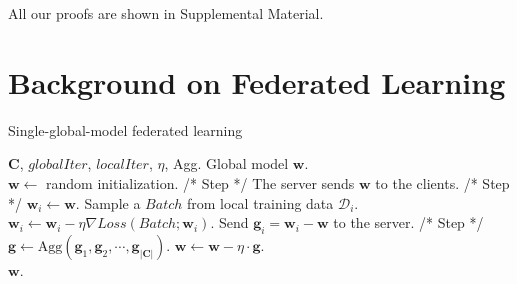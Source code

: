 \documentclass[letterpaper]{article} %
\newcommand{\RomanNumeralCaps}[1]
    {\MakeUppercase{\romannumeral #1}}
\begin{document}
All our proofs are shown in Supplemental Material.



\section{Background on Federated Learning}

\begin{algorithm}[t]
	\caption{Single-global-model federated learning}\label{alg:base_alg}
	\begin{algorithmic}[1]
		 $\mathbf{C}$, $globalIter$, $localIter$, $\eta$, Agg.
     Global model $\mathbf{w}$.\\
		\STATE $\mathbf{w} \leftarrow $ random initialization.
		    \STATE /* Step \RomanNumeralCaps{1} */
		    \STATE The server sends $\mathbf{w}$ to the clients.
	        \STATE /* Step \RomanNumeralCaps{2} */
		        \STATE $\mathbf{w}_i \leftarrow \mathbf{w}$.
		            \STATE Sample a $Batch$ from local training data $\mathcal{D}_i$.
		            \STATE $\mathbf{w}_i \leftarrow \mathbf{w}_i - \eta \nabla Loss(Batch;\mathbf{w}_i)$.
		        \ENDFOR
	            \STATE Send $\mathbf{g}_i=\mathbf{w}_i-\mathbf{w}$ to the server.
		    \ENDFOR
		    \STATE /* Step \RomanNumeralCaps{3} */
            \STATE $\mathbf{g} \leftarrow \text{Agg}(\mathbf{g}_1, \mathbf{g}_2, \cdots, \mathbf{g}_{|\mathbf{C}|})$.
            \STATE $\mathbf{w} \leftarrow \mathbf{w} - \eta\cdot \mathbf{g}$.
		\ENDFOR\\
		\RETURN $\mathbf{w}$.
	\end{algorithmic}
\end{algorithm}
\end{document}
